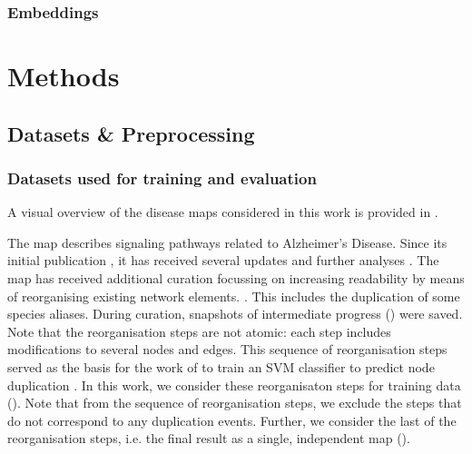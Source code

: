 \documentclass[
	fontsize=10pt, %
	twoside=false, %
	secnumdepth=1, %
]{kaobook}
\begin{document}
\subsection{Embeddings}









\chapter{Methods}
\label{sec:methods}


\section{Datasets \& Preprocessing}
\label{sec:datasets}

\subsection{Datasets used for training and evaluation}

A visual overview of the disease maps considered in this work is provided in
.

The  map describes signaling pathways related to
Alzheimer's Disease. Since its initial publication
\cite{mizuno_AlzPathwayComprehensiveMap_2012}, it has received several
updates and further analyses 
\cite{ogishima_MapAlzheimerDiseasesignaling_2013}
\cite{ogishima_AlzPathwayUpdatedMap_2016}
\cite{mizuno_NetworkAnalysisComprehensive_2016}.
%
The map has received additional curation focussing on increasing readability by
means of reorganising existing network elements.
\cite{ostaszewski_AlzPathwayRegorganisationSteps_2021}.
This includes the duplication
of some species aliases. During curation, snapshots of intermediate progress
() were saved. Note that the reorganisation steps are
not atomic: each step includes modifications to several nodes and edges.
This sequence of reorganisation steps served as the basis for the
work of \citeauthor{nielsen_MachineLearningSupport_2019} to train an SVM
classifier to predict node duplication
\cite{nielsen_MachineLearningSupport_2019}. In this work, we consider these
reorganisaton steps for training data ().
Note that from the sequence of reorganisation steps, we exclude the steps that
do not correspond to any duplication events.
Further, we consider
the last of the reorganisation steps, i.e. the final result as a single,
independent map ().
\end{document}
